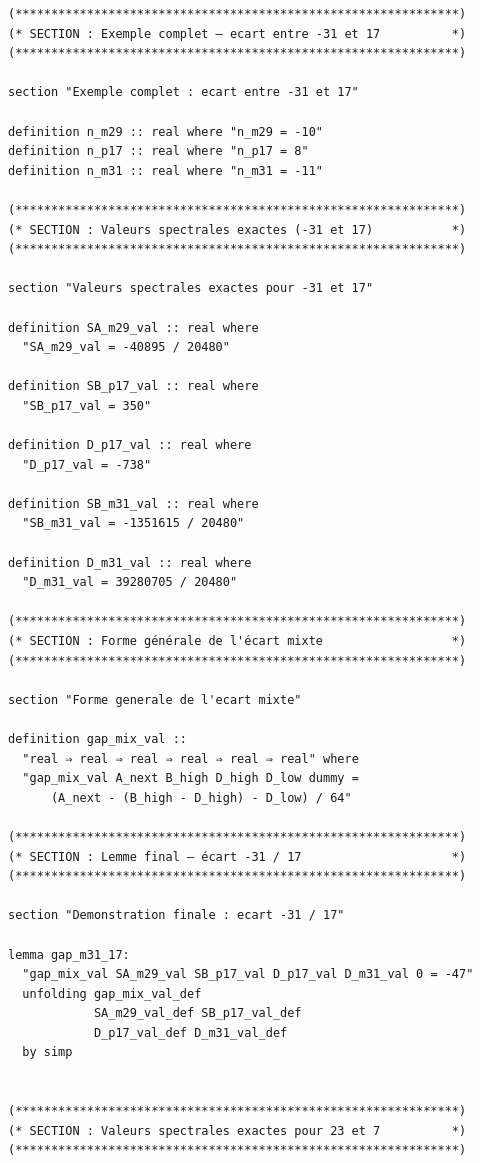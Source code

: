 \documentclass[a4paper,11pt]{article}
\begin{document}
\begin{holcode}[title={\textcolor{white}{File: methode\_spectral.thy -- Part 6/6 (END)}}]
\begin{lstlisting}
(**************************************************************)
(* SECTION : Exemple complet – ecart entre -31 et 17          *)
(**************************************************************)

section "Exemple complet : ecart entre -31 et 17"

definition n_m29 :: real where "n_m29 = -10"
definition n_p17 :: real where "n_p17 = 8"
definition n_m31 :: real where "n_m31 = -11"

(**************************************************************)
(* SECTION : Valeurs spectrales exactes (-31 et 17)           *)
(**************************************************************)

section "Valeurs spectrales exactes pour -31 et 17"

definition SA_m29_val :: real where
  "SA_m29_val = -40895 / 20480"

definition SB_p17_val :: real where
  "SB_p17_val = 350"

definition D_p17_val :: real where
  "D_p17_val = -738"

definition SB_m31_val :: real where
  "SB_m31_val = -1351615 / 20480"

definition D_m31_val :: real where
  "D_m31_val = 39280705 / 20480"

(**************************************************************)
(* SECTION : Forme générale de l'écart mixte                  *)
(**************************************************************)

section "Forme generale de l'ecart mixte"

definition gap_mix_val ::
  "real ⇒ real ⇒ real ⇒ real ⇒ real ⇒ real" where
  "gap_mix_val A_next B_high D_high D_low dummy =
      (A_next - (B_high - D_high) - D_low) / 64"

(**************************************************************)
(* SECTION : Lemme final – écart -31 / 17                     *)
(**************************************************************)

section "Demonstration finale : ecart -31 / 17"

lemma gap_m31_17:
  "gap_mix_val SA_m29_val SB_p17_val D_p17_val D_m31_val 0 = -47"
  unfolding gap_mix_val_def
            SA_m29_val_def SB_p17_val_def
            D_p17_val_def D_m31_val_def
  by simp


(**************************************************************)
(* SECTION : Valeurs spectrales exactes pour 23 et 7          *)
(**************************************************************)


\end{lstlisting}
\end{holcode}
\end{document}
